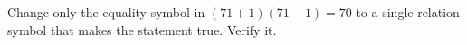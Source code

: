 Change only the equality symbol in $(71+1)(71-1)=70$ to a single relation symbol that makes the statement true. Verify it.
